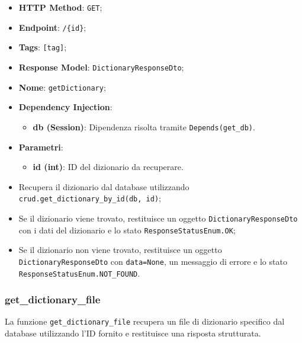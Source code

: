 \begin{itemize}
\item \textbf{HTTP Method}: \texttt{GET};
\item \textbf{Endpoint}: \texttt{/\{id\}};
\item \textbf{Tags}: \texttt{[tag]};
\item \textbf{Response Model}: \texttt{DictionaryResponseDto};
\item \textbf{Nome}: \texttt{getDictionary};
\item \textbf{Dependency Injection}:
\begin{itemize}
\item \textbf{db (Session)}: Dipendenza risolta tramite \texttt{Depends(get\_db)}.
\end{itemize}
\item \textbf{Parametri}:
\begin{itemize}
\item \textbf{id (int)}: ID del dizionario da recuperare.
\end{itemize}
\end{itemize}

\begin{itemize}
\item Recupera il dizionario dal database utilizzando \texttt{crud.get\_dictionary\_by\_id(db, id)};
\item Se il dizionario viene trovato, restituisce un oggetto \texttt{DictionaryResponseDto} con i dati del dizionario e lo stato \texttt{ResponseStatusEnum.OK};
\item Se il dizionario non viene trovato, restituisce un oggetto \texttt{DictionaryResponseDto} con \texttt{data=None}, un messaggio di errore e lo stato \texttt{ResponseStatusEnum.NOT\_FOUND}.
\end{itemize}

\subsubsection{get\_dictionary\_file}

\par La funzione \texttt{get\_dictionary\_file} recupera un file di dizionario specifico dal database utilizzando l'ID fornito e restituisce una risposta strutturata.

